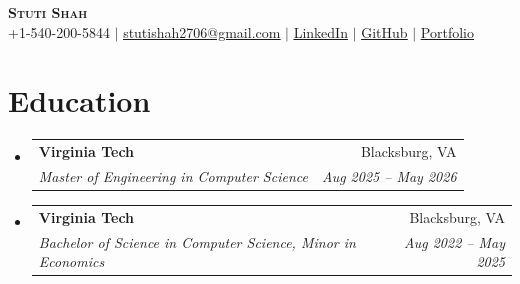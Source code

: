 \documentclass[letterpaper,11pt]{article}
\makeatletter
\newcommand{\resumeSubheading}[4]{
  \vspace{-2pt}\item
    \begin{tabular*}{0.97\textwidth}[t]{l@{\extracolsep{\fill}}r}
      \textbf{#1} & #2 \\
      \textit{\small#3} & \textit{\small #4} \\
    \end{tabular*}\vspace{-7pt}
}
\newcommand{\resumeSubHeadingListStart}{\begin{itemize}[leftmargin=0.15in, label={}]}
\newcommand{\resumeSubHeadingListEnd}{\end{itemize}}
\makeatother
\begin{document}
\begin{center}
    \textbf{\Huge \scshape Stuti Shah} \\ \vspace{1pt}
    \small +1-540-200-5844 $|$ \href{mailto:stutishah2706@gmail.com}{\underline{stutishah2706@gmail.com}} $|$ \href{https://linkedin.com/in/stutishah9}{\underline{LinkedIn}} $|$ \href{https://github.com/stutshah9}{\underline{GitHub}} $|$ \href{https://stutshah9.github.io/}{\underline{Portfolio}}
\end{center}

\section{Education}
  \resumeSubHeadingListStart
    \resumeSubheading
      {Virginia Tech}{Blacksburg, VA}
      {Master of Engineering in Computer Science}{Aug 2025 -- May 2026}
    \resumeSubheading
      {Virginia Tech}{Blacksburg, VA}
      {Bachelor of Science in Computer Science, Minor in Economics}{Aug 2022 -- May 2025}
  \resumeSubHeadingListEnd
\end{document}
